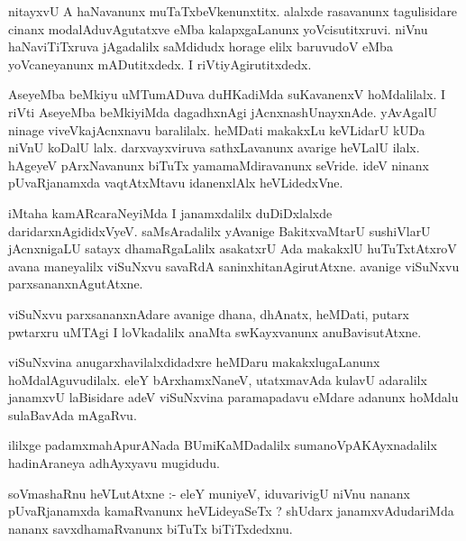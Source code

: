 \documentclass{article}
\begin{document}
\begin{mn}
nitayxvU A haNavanunx  muTaTxbeVkenunxtitx.  alalxde rasavanunx tagulisidare 
cinanx modalAduvAgutatxve  eMba kalapxgaLanunx yoVcisutitxruvi.  niVnu 
haNaviTiTxruva jAgadalilx saMdidudx  horage elilx baruvudoV eMba 
yoVcaneyanunx mADutitxdedx.  I riVtiyAgirutitxdedx.  
\end{mn}

\begin{mn}
AseyeMba beMkiyu uMTumADuva  duHKadiMda suKavanenxV hoMdalilalx.  I riVti 
AseyeMba beMkiyiMda dagadhxnAgi  jAcnxnashUnayxnAde.  yAvAgalU ninage 
viveVkajAcnxnavu  baralilalx.  heMDati makakxLu keVLidarU kUDa niVnU koDalU  
lalx.  darxvayxviruva  sathxLavanunx  avarige heVLalU ilalx.  hAgeyeV  
pArxNavanunx biTuTx  yamamaMdiravanunx seVride. ideV ninanx pUvaRjanamxda 
vaqtAtxMtavu  idanenxlAlx  heVLidedxVne.
\end{mn}

\begin{mn}
iMtaha kamARcaraNeyiMda I janamxdalilx duDiDxlalxde daridarxnAgididxVyeV.  
saMsAradalilx yAvanige BakitxvaMtarU sushiVlarU jAcnxnigaLU  satayx 
dhamaRgaLalilx asakatxrU Ada makakxlU  huTuTxtAtxroV avana  maneyalilx 
viSuNxvu savaRdA saninxhitanAgirutAtxne.  avanige viSuNxvu parxsananxnAgutAtxne. 
\end{mn}

\begin{mn}
viSuNxvu parxsananxnAdare avanige dhana,  dhAnatx, heMDati, putarx pwtarxru  
uMTAgi I loVkadalilx anaMta swKayxvanunx anuBavisutAtxne. 
\end{mn}

\begin{mn}
viSuNxvina anugarxhavilalxdidadxre heMDaru makakxlugaLanunx hoMdalAguvudilalx.  
eleY bArxhamxNaneV, utatxmavAda kulavU adaralilx janamxvU laBisidare adeV  
viSuNxvina paramapadavu eMdare adanunx hoMdalu sulaBavAda mAgaRvu.
\end{mn}

\begin{mn}
ililxge padamxmahApurANada BUmiKaMDadalilx sumanoVpAKAyxnadalilx hadinAraneya adhAyxyavu mugidudu.
\end{mn}


\begin{mn}
soVmashaRnu heVLutAtxne :- eleY muniyeV, iduvarivigU niVnu nananx pUvaRjanamxda kamaRvanunx 
heVLideyaSeTx ?  shUdarx janamxvAdudariMda nananx savxdhamaRvanunx biTuTx biTiTxdedxnu.
\end{mn}
\end{document}
